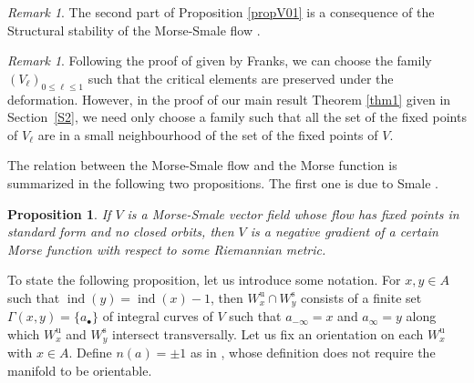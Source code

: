 \documentclass[JEP,XML,SOM,Unicode]{cedram}
\newcommand{\sbullet}{{\scriptscriptstyle\bullet}}
\newcommand{\rs}{\mathrm{s}}
\newcommand{\ru}{\mathrm{u}}
\theoremstyle{plain}
\newtheorem{prop}[lem]{Proposition}
\theoremstyle{definition}
\theoremstyle{remark}
\newtheorem{re}[lem]{Remark}
\DeclareMathOperator{\ind}{ind}
\let\l\leqslant
\begin{document}
\begin{re}
The second part of Proposition \ref{propV01} is a consequence of
the Structural stability of the Morse-Smale flow \cite{Palis68,PalisSmale70}.
\end{re}

\begin{re}\label{reVl}
Following the proof of \cite[Prop.\,1.6]{Franks1979}
given by Franks, we can choose the family $(V_{\ell})_{0\l
\ell \l1}$ such that the critical elements are preserved
under the deformation. However, in the proof of our main result
Theorem \ref{thm1} given in Section~\ref{S2}, we need only
choose a family such that all the set of the fixed points of
$V_{\ell}$ are in a small neighbourhood of the set of the fixed points of $V$.
\end{re}

The relation between the Morse-Smale flow and the Morse function is
summarized in the following two propositions. The first one is due to
Smale \cite[Th.\,B]{S61}.

\begin{prop}
If $V$ is a Morse-Smale vector field whose flow has fixed points
in standard form and no closed orbits, then $V$ is a negative gradient of
a certain Morse function with respect to some Riemannian metric.
\end{prop}

To state the following proposition, let us introduce some notation.
For $x,y\in A$ such that $\ind(y)=\ind(x)-1$, then $W^{\ru}_{x}\cap W^{\rs}_{y}$
consists of a finite set $\Gamma(x,y)=\{a_{\sbullet}\}$ of integral curves of
$V$ such that $a_{-\infty}=x$ and $a_{\infty}=y$ along
which $W^{\ru}_{x}$ and $W^{\rs}_{y}$ intersect transversally. Let us fix
an orientation on each $W^{\ru}_{x}$ with $x\in A$. Define
$n(a)=\pm1$ as in \cite[(1.28)]{BZ92}, whose definition does not
require the manifold to be orientable.
\end{document}
